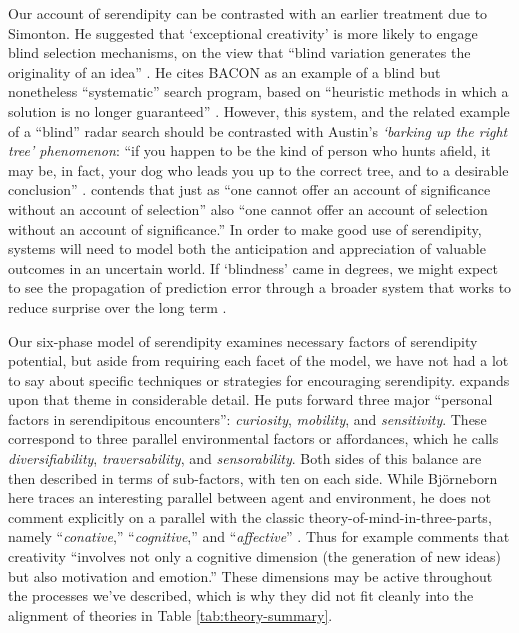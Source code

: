 Our account of serendipity can be contrasted with an earlier treatment due to Simonton.  
He suggested that `exceptional
creativity' is more likely to engage blind selection mechanisms, on
the view that ``blind variation generates the originality of an
idea'' \citet[p.~158]{simonton2010creative}.  He cites {\sf BACON} \cite{langley1987scientific} as an
example of a blind but nonetheless ``systematic'' search program,
based on ``heuristic methods in which a solution is no longer
guaranteed'' \cite[p.~169]{simonton2010creative}.  However, this
system, and the related example of a ``blind'' radar search
\cite[p.~383]{campbell1960blind} should be contrasted with Austin's
\emph{`barking up the right tree' phenomenon}: ``if you happen to be
the kind of person who hunts afield, it may be, in fact, your dog who
leads you up to the correct tree, and to a desirable conclusion''
\cite[p.~50]{austin1978chase}.
\citet[p.~720]{kockelman2011biosemiosis} contends that just as ``one
cannot offer an account of significance without an account of
selection'' also ``one cannot offer an account of selection without an
account of significance.''  In order to make good use of serendipity,
systems will need to model both the anticipation and appreciation of
valuable outcomes in an uncertain world.
If `blindness' came in degrees, we might expect to see the
propagation of prediction error through a broader system that works to
reduce surprise over the long term \cite{Kiverstein2017,Friston2012}.  

Our six-phase model of serendipity examines necessary factors of serendipity
potential, but aside from requiring each facet of the model, we have
not had a lot to say about specific techniques or strategies for
encouraging serendipity.  \citet{bjorneborn2017three} expands upon
that theme in considerable detail.  He puts forward three major
``personal factors in serendipitous encounters'': \emph{curiosity},
\emph{mobility}, and \emph{sensitivity}.  These correspond to three
parallel environmental factors or affordances, which he calls
\emph{diversifiability}, \emph{traversability}, and
\emph{sensorability}.  Both sides of this balance are then described
in terms of sub-factors, with ten on each side.  While Bj\"orneborn
here traces an interesting parallel between agent and environment, he
does not comment explicitly on a parallel with the classic theory-of-mind-in-three-parts, namely ``\emph{conative},''
``\emph{cognitive},'' and ``\emph{affective}''
\cite{hilgard1980trilogy}.
Thus for example \citet[p.~347]{boden1998creativity} comments that
creativity ``involves not only a cognitive dimension (the generation
of new ideas) but also motivation and emotion.''
These dimensions may be active throughout the processes we've
described, which is why they did not fit cleanly into the alignment of
theories in Table \ref{tab:theory-summary}.

